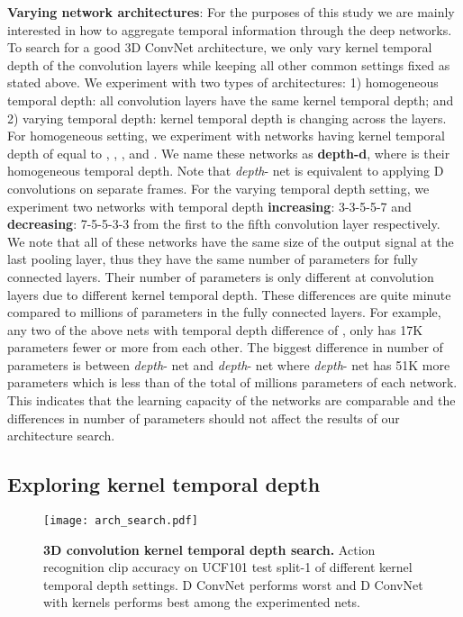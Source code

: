 \documentclass[10pt,twocolumn,letterpaper]{article}
\begin{document}
{\bf Varying network architectures}: For the purposes of this study we are mainly interested in how to aggregate temporal information through the deep networks. To search for a good 3D ConvNet architecture, we only vary kernel temporal depth  of the convolution layers while keeping all other common settings fixed as stated above. We experiment with two types of architectures: 1) homogeneous temporal depth: all convolution layers have the same kernel temporal depth; and 2) varying temporal depth: kernel temporal depth is changing across the layers. For homogeneous setting, we experiment with  networks having kernel temporal depth of  equal to , , , and . We name these networks as {\bf depth-d}, where  is their homogeneous temporal depth. Note that \emph{depth}- net is equivalent to applying D convolutions on separate frames. For the varying temporal depth setting, we experiment two networks with temporal depth {\bf increasing}: 3-3-5-5-7 and {\bf decreasing}: 7-5-5-3-3 from the first to the fifth convolution layer respectively. We note that all of these networks have the same size of the output signal at the last pooling layer, thus they have the same number of parameters for fully connected layers. Their number of parameters is only different at convolution layers due to different kernel temporal depth. These differences are quite minute compared to millions of parameters in the fully connected layers. For example, any two of the above nets with temporal depth difference of , only has 17K parameters fewer or more from each other. The biggest difference in number of parameters is between \emph{depth}- net and \emph{depth}- net where \emph{depth}- net has 51K more parameters which is less than  of the total of  millions parameters of each network. This indicates that the learning capacity of the networks are comparable and the differences in number of parameters should not affect the results of our architecture search.

\subsection{Exploring kernel temporal depth}
\label{sec:arch_search}

\begin{figure}
\begin{center}
   \texttt{[image: arch\_search.pdf]}
\end{center}
\vspace{-12pt}
   \caption{{\bf 3D convolution kernel temporal depth search.} Action recognition clip accuracy on UCF101 test split-1 of different kernel temporal depth settings. D ConvNet performs worst and D ConvNet with  kernels performs best among the experimented nets.}
\label{fig:c3d_arch_search}
\vspace{-12pt}
\end{figure}
\end{document}
